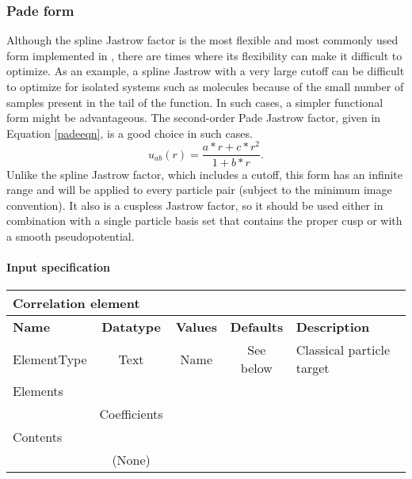 \subsubsection{Pade form}
\label{sec:onebodyjastrowpade}

Although the spline Jastrow factor is the most flexible and most commonly used form implemented in \qmcpack, 
there are times where its flexibility can make it difficult to optimize.  As an example, a spline Jastrow
with a very large cutoff can be difficult to optimize for isolated systems such as molecules because of the small
number of samples present in the tail of the function.  In such cases, a simpler functional
form might be advantageous.  The second-order Pade Jastrow factor, given in Equation \ref{padeeqn}, is a good choice 
in such cases.  
\begin{equation}
\label{padeeqn}
u_{ab}(r) = \frac{a*r+c*r^2}{1+b*r} .
\end{equation}
Unlike the spline Jastrow factor, which includes a cutoff, this form has an infinite range and will be applied to every particle
pair (subject to the minimum image convention).  It also is a cuspless Jastrow factor,
so it should be used either in combination with a single particle basis set that contains the proper cusp or
with a smooth pseudopotential.

\paragraph{Input specification}
\begin{table}[h]
\begin{center}
\begin{tabular}{l c c c l }
\hline
\multicolumn{5}{l}{Correlation element} \\
\hline
\bfseries Name & \bfseries Datatype & \bfseries Values & \bfseries Defaults & \bfseries Description \\
\hline
ElementType & Text & Name & See below & Classical particle target  \\
\hline
\multicolumn{5}{l}{Elements}\\ \hline
& Coefficients & & & \\ \hline
\multicolumn{5}{l}{Contents}\\ \hline
& (None)  & & &  \\ \hline
\end{tabular}
\end{center}
\end{table}

